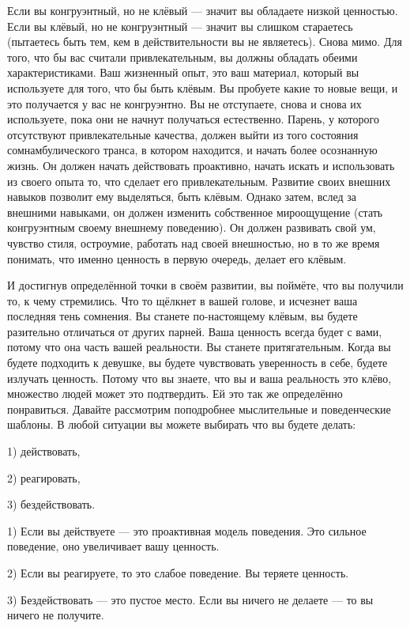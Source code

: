 \RULE  Если вы конгруэнтный, но не клёвый --- значит вы обладаете низкой ценностью. Если вы клёвый, но не конгруэнтный --- значит вы слишком стараетесь (пытаетесь быть тем, кем в действительности вы не являетесь). Снова мимо. Для того, что бы вас считали привлекательным, вы должны обладать обеими характеристиками. Ваш жизненный опыт, это ваш материал, который вы используете для того, что бы быть клёвым. Вы пробуете какие то новые вещи, и это получается у вас не конгруэнтно. Вы не отступаете, снова и снова их используете, пока они не начнут получаться естественно. Парень, у которого отсутствуют привлекательные качества, должен выйти из того состояния сомнамбулического транса, в котором находится, и начать более осознанную жизнь. Он должен начать действовать проактивно, начать искать и использовать из своего опыта то, что сделает его привлекательным. Развитие своих внешних навыков позволит ему выделяться, быть клёвым. Однако затем, вслед за внешними навыками, он должен изменить собственное мироощущение (стать конгруэнтным своему внешнему поведению). Он должен развивать свой ум, чувство стиля, остроумие, работать над своей внешностью, но в то же время понимать, что именно ценность в первую очередь, делает его клёвым.

\RULE  И достигнув определённой точки в своём развитии, вы поймёте, что вы получили то, к чему стремились. Что то щёлкнет в вашей голове, и исчезнет ваша последняя тень сомнения. Вы станете по-настоящему клёвым, вы будете разительно отличаться от других парней. Ваша ценность всегда будет с вами, потому что она часть вашей реальности. Вы станете притягательным. Когда вы будете подходить к девушке, вы будете чувствовать уверенность в себе, будете излучать ценность. Потому что вы знаете, что вы и ваша реальность это клёво, множество людей может это подтвердить. Ей это так же определённо понравиться. Давайте рассмотрим поподробнее мыслительные и поведенческие шаблоны. В любой ситуации вы можете выбирать что вы будете делать:

1) действовать,

2) реагировать,

3) бездействовать.

1) Если вы действуете --- это проактивная модель поведения. Это сильное поведение, оно увеличивает вашу ценность.

2) Если вы реагируете, то это слабое поведение. Вы теряете ценность.

3) Бездействовать --- это пустое место. Если вы ничего не делаете --- то вы ничего не получите.

